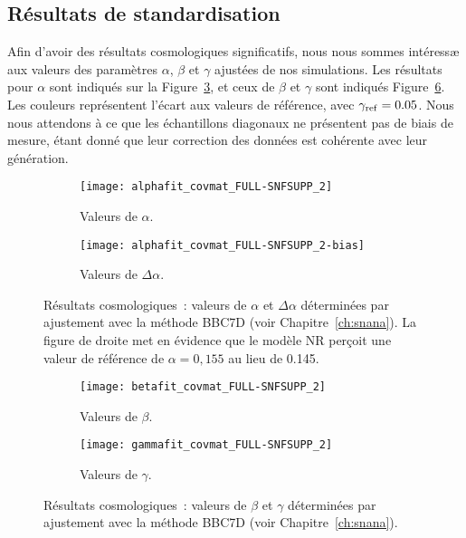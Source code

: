 \documentclass[../main/main.tex]{subfiles}
\begin{document}
\subsection{Résultats de standardisation}\label{ssec:simabg}

Afin d'avoir des résultats cosmologiques significatifs, nous nous sommes
intéressæ aux valeurs des paramètres $\alpha$, $\beta$ et $\gamma$ ajustées de
nos simulations.  Les résultats pour $\alpha$ sont indiqués sur la
Figure~\ref{fig:cosmo1}, et ceux de $\beta$ et $\gamma$ sont indiqués
Figure~\ref{fig:cosmo2}. Les couleurs représentent l'écart aux valeurs de
référence, avec $\gamma_{\rm ref} = \num{0.05}$. Nous nous attendons à ce que
les échantillons diagonaux ne présentent pas de biais de mesure, étant donné que
leur correction des données est cohérente avec leur génération.

\begin{figure}[ht]
    \centering
    \begin{subfigure}[]{.48\linewidth}
        \centering
        \texttt{[image: alphafit\_covmat\_FULL-SNFSUPP\_2]}
        \caption[Valeurs de $\alpha$ avec le modèle de masse SNfsupp]{Valeurs de
        $\alpha$.}
        \label{fig:cosmoa}
    \end{subfigure}
    \hfill
    \begin{subfigure}[]{.48\linewidth}
        \centering
        \texttt{[image: alphafit\_covmat\_FULL-SNFSUPP\_2-bias]}
        \caption[Valeurs de $\Delta\alpha$ avec le modèle de masse
        SNfsupp]{Valeurs de $\Delta\alpha$.}
        \label{fig:cosmoda}
    \end{subfigure}
    \caption[Résultats cosmologiques~: $\alpha$ et $\Delta\alpha$]{Résultats
        cosmologiques~: valeurs de $\alpha$ et $\Delta\alpha$ déterminées par
        ajustement avec la méthode BBC7D (voir
        Chapitre~\ref{ch:snana}). La figure de droite met en
        évidence que le modèle NR perçoit une valeur de référence de $\alpha =
    0,155$ au lieu de \num{0.145}.}
    \label{fig:cosmo1}
\end{figure}

\begin{figure}[h!]
    \centering
    \begin{subfigure}[]{.48\linewidth}
        \centering
        \texttt{[image: betafit\_covmat\_FULL-SNFSUPP\_2]}
        \caption[Valeurs de $\beta$ avec le modèle de masse SNfsupp]{Valeurs de
        $\beta$.}
        \label{fig:cosmob}
    \end{subfigure}
    \hfill
    \begin{subfigure}[]{.48\linewidth}
        \centering
        \texttt{[image: gammafit\_covmat\_FULL-SNFSUPP\_2]}
        \caption[Valeurs de $\gamma$ avec le modèle de masse SNfsupp]{Valeurs de
        $\gamma$.}
        \label{fig:cosmog}
    \end{subfigure}
    \caption[Résultats cosmologiques~: $\beta$ et $\gamma$]{Résultats
        cosmologiques~: valeurs de $\beta$ et $\gamma$ déterminées par ajustement
        avec la méthode BBC7D (voir
    Chapitre~\ref{ch:snana}).}
    \label{fig:cosmo2}
\end{figure}
\end{document}
